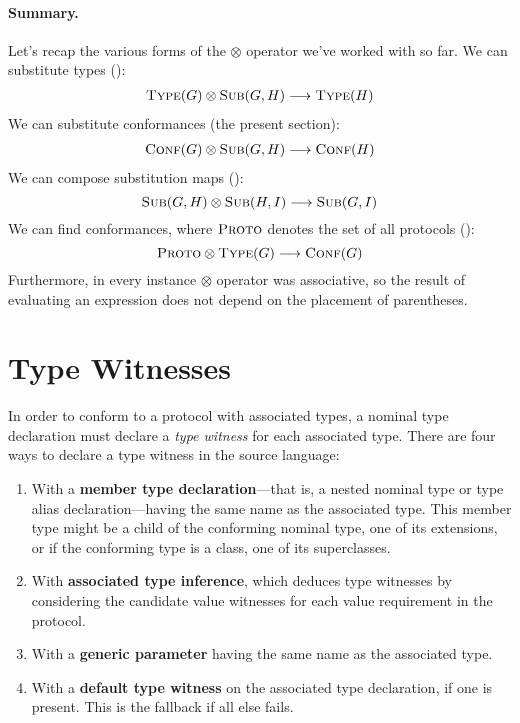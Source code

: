 \documentclass[../generics]{subfiles}
\begin{document}
\paragraph{Summary.}
Let's recap the various forms of the \index{$\otimes$}$\otimes$ operator we've worked with so far. We can substitute types ():
\begin{gather*}
\textsc{Type}({G})\otimes\textsc{Sub}({G, H})\longrightarrow\textsc{Type}({H})
\end{gather*}
We can substitute conformances (the present section):
\begin{gather*}
\textsc{Conf}({G})\otimes\textsc{Sub}({G, H})\longrightarrow\textsc{Conf}({H})
\end{gather*}
We can compose substitution maps ():
\[\textsc{Sub}({G, H})\otimes\textsc{Sub}({H, I})\longrightarrow\textsc{Sub}({G, I})\]
We can find conformances, where $\textsc{Proto}$ denotes the set of all protocols ():
\[\textsc{Proto} \otimes \textsc{Type}({G}) \longrightarrow \textsc{Conf}({G})\]
Furthermore, in every instance $\otimes$ operator was associative, so the result of evaluating an expression does not depend on the placement of parentheses.

\section{Type Witnesses}\label{type witnesses}

In order to conform to a protocol with associated types, a nominal type declaration must declare a \emph{type witness} for each associated type. There are four ways to declare a type witness in the source language:
\begin{enumerate}
\item With a \textbf{member type declaration}---that is, a nested nominal type or type alias declaration---having the same name as the associated type. This member type might be a child of the conforming nominal type, one of its extensions, or if the conforming type is a class, one of its superclasses.
\item With \textbf{associated type inference}, which deduces type witnesses by considering the candidate value witnesses for each value requirement in the protocol.
\item With a \textbf{generic parameter} having the same name as the associated type.
\item With a \textbf{default type witness} on the associated type declaration, if one is present. This is the fallback if all else fails.
\end{enumerate}
\end{document}
